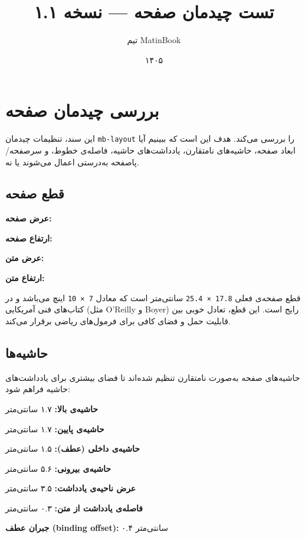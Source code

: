 \documentclass{matinbook}
\title{تست چیدمان صفحه — نسخه ۱.۱}
\author{تیم MatinBook}
\date{۱۴۰۵}
\begin{document}
\maketitle

\tableofcontents

\chapter{بررسی چیدمان صفحه}
\label{chap:test-layout}

این سند، تنظیمات چیدمان \texttt{mb-layout} را بررسی می‌کند.
هدف این است که ببینیم آیا ابعاد صفحه، حاشیه‌های نامتقارن،
یادداشت‌های حاشیه، فاصله‌ی خطوط، و سرصفحه/پاصفحه به‌درستی
اعمال می‌شوند یا نه.

\section{قطع صفحه}
\label{sec:page-size}

\textbf{عرض صفحه:} \the\paperwidth

\textbf{ارتفاع صفحه:} \the\paperheight

\textbf{عرض متن:} \the\textwidth

\textbf{ارتفاع متن:} \the\textheight

قطع صفحه‌ی فعلی \texttt{17.8 × 25.4} سانتی‌متر است که معادل
\texttt{7 × 10} اینچ می‌باشد و در کتاب‌های فنی آمریکایی
(مثل O'Reilly و Boyer) رایج است. این قطع، تعادل خوبی بین
قابلیت حمل و فضای کافی برای فرمول‌های ریاضی برقرار می‌کند.

\section{حاشیه‌ها}
\label{sec:margins}

حاشیه‌های صفحه به‌صورت نامتقارن تنظیم شده‌اند تا فضای
بیشتری برای یادداشت‌های حاشیه فراهم شود:

\textbf{حاشیه‌ی بالا:} ۱.۷ سانتی‌متر

\textbf{حاشیه‌ی پایین:} ۱.۷ سانتی‌متر

\textbf{حاشیه‌ی داخلی (عطف):} ۱.۵ سانتی‌متر

\textbf{حاشیه‌ی بیرونی:} ۵.۶ سانتی‌متر

\textbf{عرض ناحیه‌ی یادداشت:} ۳.۵ سانتی‌متر

\textbf{فاصله‌ی یادداشت از متن:} ۰.۳ سانتی‌متر

\textbf{جبران عطف (binding offset):} ۰.۴ سانتی‌متر
\end{document}
